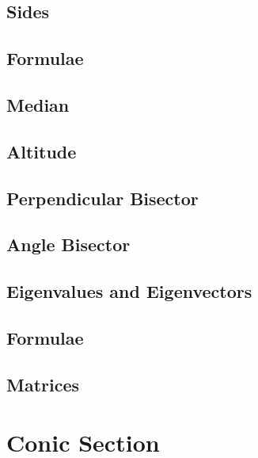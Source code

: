 \documentclass[journal]{IEEEtran}
\begin{document}
\subsection{Sides}

\subsection{Formulae}

\subsection{Median}

\subsection{Altitude}

\subsection{Perpendicular Bisector}

\subsection{Angle Bisector}

\subsection{Eigenvalues and Eigenvectors}

\subsection{Formulae}

\subsection{Matrices}

\newpage
\section{Conic Section}

\end{document}
